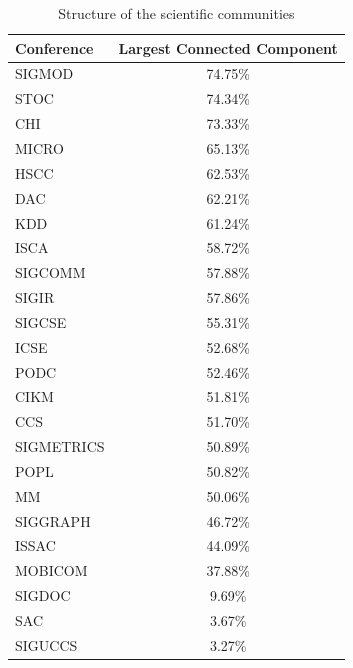 \documentclass{sig-alternate-10pt}
\begin{document}
\begin{table}[!htbp]
\caption{Structure of the scientific communities}
\centering
\begin{scriptsize}
\begin{tabular}{|l|c|} \hline
\textbf{Conference} & \textbf{Largest Connected Component}  \\ \hline
SIGMOD & 74.75\%  \\ \hline
STOC & 74.34\% \\ \hline
CHI & 73.33\%  \\ \hline
MICRO & 65.13\%  \\ \hline
HSCC & 62.53\%  \\ \hline
DAC & 62.21\%  \\ \hline
KDD & 61.24\% \\ \hline
ISCA & 58.72\% \\ \hline
SIGCOMM & 57.88\%  \\ \hline
SIGIR & 57.86\%  \\ \hline
SIGCSE & 55.31\%  \\ \hline
ICSE & 52.68\%  \\ \hline
PODC & 52.46\% \\ \hline
CIKM & 51.81\%  \\ \hline
CCS & 51.70\%  \\ \hline
SIGMETRICS & 50.89\%  \\ \hline
POPL & 50.82\%  \\ \hline
MM & 50.06\% \\ \hline
SIGGRAPH & 46.72\%  \\ \hline
ISSAC & 44.09\% \\ \hline
MOBICOM & 37.88\%  \\ \hline
SIGDOC & 9.69\% \\ \hline
SAC & 3.67\% \\ \hline
SIGUCCS & 3.27\% \\ \hline
\end{tabular}
\end{scriptsize}
\label{tab:largestSCC}
\end{table}
\end{document}
